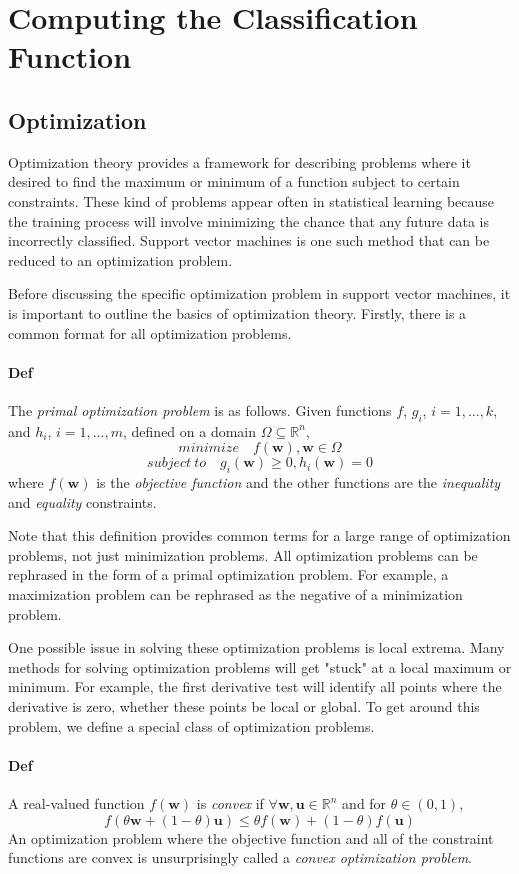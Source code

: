 \documentclass{article}
\begin{document}
\section{Computing the Classification Function}
\subsection{Optimization}
Optimization theory provides a framework for describing problems where it desired to find the maximum or minimum of a function subject to certain constraints. These kind of problems appear often in statistical learning because the training process will involve minimizing the chance that any future data is incorrectly classified. Support vector machines is one such method that can be reduced to an optimization problem.

Before discussing the specific optimization problem in support vector machines, it is important to outline the basics of optimization theory. Firstly, there is a common format for all optimization problems.

\paragraph{Def} The \textit{primal optimization problem} is as follows. Given functions $f$, $g_i$, $i=1,\dots,k$, and $h_i$, $i = 1,\dots,m$, defined on a domain $\Omega \subseteq \mathbb{R}^n$,
$$ minimize \quad f(\mathbf{w}), \mathbf{w} \in \Omega$$
$$ subject\ to \quad g_i(\mathbf{w}) \geq 0, h_i(\mathbf{w}) = 0$$
where $f(\mathbf{w})$ is the \textit{objective function} and the other functions are the \textit{inequality} and \textit{equality} constraints.

Note that this definition provides common terms for a large range of optimization problems, not just minimization problems. All optimization problems can be rephrased in the form of a primal optimization problem. For example, a maximization problem can be rephrased as the negative of a minimization problem.

One possible issue in solving these optimization problems is local extrema. Many methods for solving optimization problems will get "stuck" at a local maximum or minimum. For example, the first derivative test will identify all points where the derivative is zero, whether these points be local or global. To get around this problem, we define a special class of optimization problems.

\paragraph{Def} A real-valued function $f(\mathbf{w})$ is \textit{convex} if $\forall \mathbf{w},\mathbf{u} \in \mathbb{R}^n$ and for $\theta \in (0,1)$,
$$ f(\theta \mathbf{w}+(1-\theta)\mathbf{u}) \leq \theta f(\mathbf{w}) + (1-\theta)f(\mathbf{u})$$
An optimization problem where the objective function and all of the constraint functions are convex is unsurprisingly called a \textit{convex optimization problem}.
\end{document}
